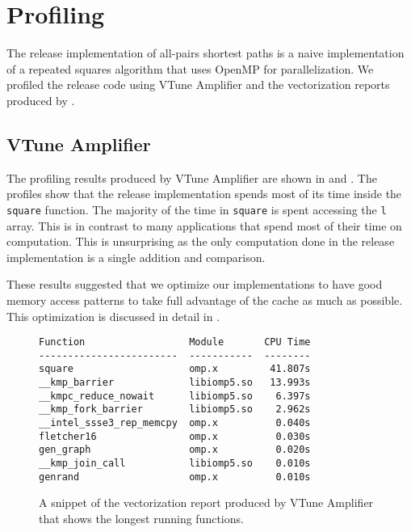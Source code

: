 \section{Profiling}\label{sec:profiling}
The release implementation of all-pairs shortest paths is a naive
implementation of a repeated squares algorithm that uses OpenMP for
parallelization.  We profiled the release code using VTune Amplifier and the
vectorization reports produced by \icc{}.

\subsection{VTune Amplifier}
The profiling results produced by VTune Amplifier are shown in 
and . The profiles show that the release implementation spends
most of its time inside the \texttt{square} function. The majority of the time
in \texttt{square} is spent accessing the \texttt{l} array. This is in contrast
to many applications that spend most of their time on computation. This is
unsurprising as the only computation done in the release implementation is a
single addition and comparison.

These results suggested that we optimize our implementations to have good memory
access patterns to take full advantage of the cache as much as possible. This
optimization is discussed in detail in .

\begin{figure}[h]
\centering
{
\begin{BVerbatim}
Function                  Module       CPU Time
------------------------  -----------  --------
square                    omp.x         41.807s
__kmp_barrier             libiomp5.so   13.993s
__kmpc_reduce_nowait      libiomp5.so    6.397s
__kmp_fork_barrier        libiomp5.so    2.962s
__intel_ssse3_rep_memcpy  omp.x          0.040s
fletcher16                omp.x          0.030s
gen_graph                 omp.x          0.020s
__kmp_join_call           libiomp5.so    0.010s
genrand                   omp.x          0.010s
\end{BVerbatim}
}
\caption{%
  A snippet of the vectorization report produced by VTune Amplifier that shows
  the longest running functions.
}
\label{fig:vtune-a}
\end{figure}

